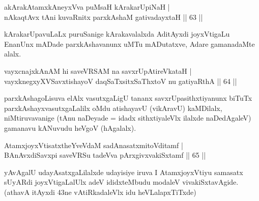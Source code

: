 
\begin{shl}
\footnotemark[1]{}akArakAtamxkAneyxVva puMsaH kArakarUpiNaH | \\
nAkaqtAvx tAni kuvaRnitx parxkAshaM gativadayxtaH \hfill||  63 ||  
\end{shl}

\begin{artha}
kArakarUpavuLaLx puruSanige kArakavalalxda AditAyxdi joyxVtigaLu EnanUnx mADade parxkAshavanunx uMTu mADutatxve, Adare gamanadaMte alalx.
\end{artha}

 
\begin{shl}
vayxcnajxkAnAM hi saveVRSAM na savxrUpAtireVkataH | \\
vayxknegxyXVSavxtishayoV daqSaTxsitxSaThxtoV nu gatiyaRthA \hfill||  64 ||  
\end{shl}

\begin{artha}
parxkAshagoLisuva elAlx vasutxgaLigU tananx savxrUpasithxtiyanunx biTuTx parxkAshayxvasutxgaLalilx oMdu atishayavU (vikAravU) kaMDilalx, niMtiruvavanige (tAnu naDeyade = idadx sithxtiyaleVlx ilalxde naDedAgaleV) gamanavu kANuvudu heVgoV (hAgalalx).
\end{artha}

\begin{shl}
AtamxjoyxVtisatxtheYveVdaM sadAnasatxmitoVditamf | \\
BAnAvxdiSavxpi saveVRSu tadeVva pArxgivxvakiSxtamf \hfill||  65 ||  
\end{shl}

\begin{artha}
yAvAgalU udayAsatxgaLilalxde udayisiye iruva I AtamxjoyxVtiyu samasatx sUyARdi joyxVtigaLalUlx adeV ididxteMbudu modaleV vivakiSxtavAgide. (athavA itAyxdi 43ne vAtiRkadaleVlx idu heVLalapxTiTxde)
\end{artha}

